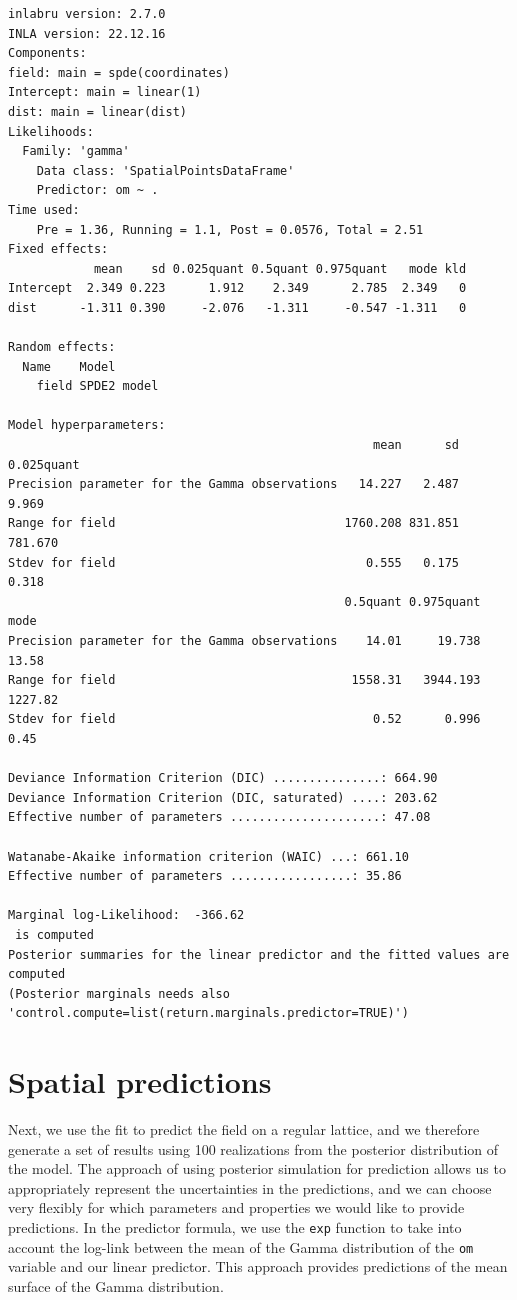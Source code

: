 \documentclass[
  a4paper,
]{article}
\begin{document}
\begin{verbatim}
inlabru version: 2.7.0
INLA version: 22.12.16
Components:
field: main = spde(coordinates)
Intercept: main = linear(1)
dist: main = linear(dist)
Likelihoods:
  Family: 'gamma'
    Data class: 'SpatialPointsDataFrame'
    Predictor: om ~ .
Time used:
    Pre = 1.36, Running = 1.1, Post = 0.0576, Total = 2.51 
Fixed effects:
            mean    sd 0.025quant 0.5quant 0.975quant   mode kld
Intercept  2.349 0.223      1.912    2.349      2.785  2.349   0
dist      -1.311 0.390     -2.076   -1.311     -0.547 -1.311   0

Random effects:
  Name    Model
    field SPDE2 model

Model hyperparameters:
                                                   mean      sd 0.025quant
Precision parameter for the Gamma observations   14.227   2.487      9.969
Range for field                                1760.208 831.851    781.670
Stdev for field                                   0.555   0.175      0.318
                                               0.5quant 0.975quant    mode
Precision parameter for the Gamma observations    14.01     19.738   13.58
Range for field                                 1558.31   3944.193 1227.82
Stdev for field                                    0.52      0.996    0.45

Deviance Information Criterion (DIC) ...............: 664.90
Deviance Information Criterion (DIC, saturated) ....: 203.62
Effective number of parameters .....................: 47.08

Watanabe-Akaike information criterion (WAIC) ...: 661.10
Effective number of parameters .................: 35.86

Marginal log-Likelihood:  -366.62 
 is computed 
Posterior summaries for the linear predictor and the fitted values are computed
(Posterior marginals needs also 'control.compute=list(return.marginals.predictor=TRUE)')
\end{verbatim}

\hypertarget{spatial-predictions}{%
\section{Spatial predictions}\label{spatial-predictions}}

Next, we use the fit to predict the field on a regular lattice, and we
therefore generate a set of results using 100 realizations from the
posterior distribution of the model. The approach of using posterior
simulation for prediction allows us to appropriately represent the
uncertainties in the predictions, and we can choose very flexibly for
which parameters and properties we would like to provide predictions. In
the predictor formula, we use the \texttt{exp} function to take into
account the log-link between the mean of the Gamma distribution of the
\texttt{om} variable and our linear predictor. This approach provides
predictions of the mean surface of the Gamma distribution.
\end{document}
